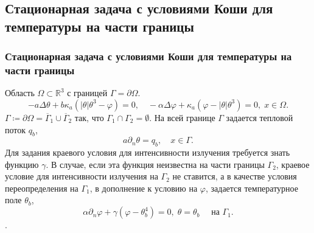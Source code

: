 \subsection{Стационарная задача с условиями Коши для температуры на части границы}\label{subsec:st-koshi}
\begin{frame}
    \frametitle{Стационарная задача с условиями Коши для температуры на части границы}
    Область $\Omega\subset \mathbb{R}^3$ с границей $\Gamma=\partial\Omega$.
    \begin{equation}
        \label{eq:2_4:eq1}
        - a\Delta\theta + b\kappa_a(|\theta|\theta^3- \varphi)=0,   \quad
        -\alpha \Delta \varphi + \kappa_a(\varphi-|\theta|\theta^3)=0,\; x\in\Omega.
    \end{equation}
    $\Gamma \coloneqq \partial \Omega =\overline{\Gamma}_1 \cup \overline{\Gamma}_2$
    так, что $\Gamma_1 \cap \Gamma_2 =  \emptyset$.
    На всей границе $\Gamma$ задается тепловой поток $q_b$,
    \begin{equation}
        \label{eq:2_4:bc1}
        a\partial_n\theta = q_b, \quad x\in \Gamma.
    \end{equation}
    Для задания краевого условия для интенсивности излучения требуется знать функцию $\gamma$.
    В случае, если эта функция неизвестна на части границы $\Gamma_2$,
    краевое условие для интенсивности излучения на $\Gamma_2$ не ставится, а в качестве условия
    переопределения на $\Gamma_1$, в дополнение к условию на
    $\varphi$, задается температурное поле $\theta_b$,
    \begin{equation}
        \label{eq:2_4:bc2}
        \alpha\partial_n\varphi + \gamma (\varphi - \theta_b ^4 ) = 0,\;
        \theta=\theta_b\quad \text{ на } \Gamma_1.
    \end{equation}.


\end{frame}

